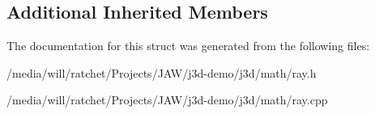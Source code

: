 \subsection*{Additional Inherited Members}


The documentation for this struct was generated from the following files\+:\begin{DoxyCompactItemize}
\item 
/media/will/ratchet/\+Projects/\+J\+A\+W/j3d-\/demo/j3d/math/ray.\+h\item 
/media/will/ratchet/\+Projects/\+J\+A\+W/j3d-\/demo/j3d/math/ray.\+cpp\end{DoxyCompactItemize}
